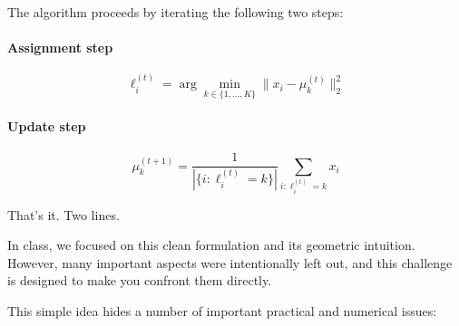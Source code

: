 \documentclass[11pt]{article}
\begin{document}
The algorithm proceeds by iterating the following two steps:

\paragraph{Assignment step}
\[
\ell_i^{(t)} = \arg\min_{k \in \{1,\dots,K\}} \|x_i - \mu_k^{(t)}\|_2^2
\]

\paragraph{Update step}
\[
\mu_k^{(t+1)} = \frac{1}{|\{i : \ell_i^{(t)} = k\}|} \sum_{i : \ell_i^{(t)} = k} x_i
\]

That’s it. Two lines.

In class, we focused on this clean formulation and its geometric intuition. However, many important aspects were intentionally left out, and this challenge is designed to make you confront them directly.

\vspace{0.3cm}

This simple idea hides a number of important practical and numerical issues:
\end{document}
